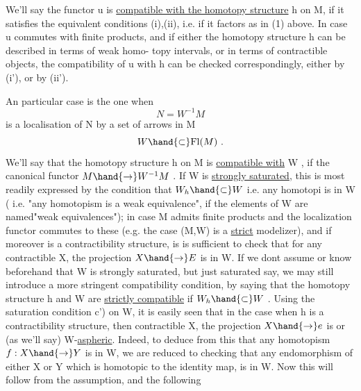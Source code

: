 
We'll say the functor u is \uline{compatible with the homotopy structure} h
on M, if it satisfies the equivalent conditions (i),(ii), i.e. if it
factors as in (1) above. In case u commutes with finite products, and
if either the homotopy structure h can be described in terms of weak homo-%
topy intervals, or in terms of contractible objects, the compatibility
of u with h can be checked correspondingly, either by (i'), or by (ii').

 An  particular case is the one when
\[ N = W^{-1}M \]
is a localisation of N by a set of arrows in M
\[ W \hand{\subset} \mathrm{Fl}(M) \ . \]
We'll say that the homotopy structure h on M is \uline{compatible with} W , if
 the canonical functor $M \hand{\to} W^{-1}M$ . If W is \uline{strongly saturated}, this
is most readily expressed by the condition that $W_h \hand{\subset} W$ i.e. any homotopi
is in W ( i.e.  "any homotopism is a weak equivalence", if the elements
of W are named"weak equivalences"); in case M admits finite products and
the localization functor commutes to these (e.g. the case (M,W) is a
\uline{strict} modelizer),  and if moreover  is a
contractibility structure,  is is sufficient to check that
for any contractible X, the projection $X \hand{\to} E$ is in W. \hand{$\Vert$}If we dont assume
or know beforehand that W is strongly saturated, but just saturated say,
we may still introduce a more stringent compatibility condition, by
saying that  the homotopy structure h and W are \uline{strictly compatible}
if $W_h \hand{\subset} W$ . Using the  saturation condition c') on W, it is easily
seen that in the case  when h is a contractibility structure, 
 then  
 contractible X, the projection $X \hand{\to} e$ is  \hand{,}
or (as we'll say) W-\uline{aspheric}.\hand{\unsure{,|)}}
\hand{(}Indeed, to deduce from this that any homotopism $f: X \hand{\to} Y$ is in W, we
are reduced to checking that any endomorphism of either X or Y which is
homotopic to the identity map, is in W. Now this will follow from the
assumption, and the following

